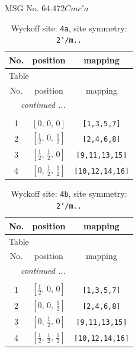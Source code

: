 \documentclass[fleqn,8pt]{jsarticle}
\begin{document}
\setcounter{MaxMatrixCols}{32}

\renewcommand{\tablename}{Table~}
\renewcommand{\figurename}{Figure~}
\begin{center}
\LARGE
MSG No. 64.472\quad$Cmc'a$
\end{center}
\renewcommand{\arraystretch}{1.2}
\begin{longtable}{ccc}
\caption{Wyckoff site: {\tt 4a}, site symmetry: {\tt 2'/m..}}
 \\
 \hline \hline
No. & position & mapping \\ \hline \endfirsthead

\multicolumn{2}{l}{\tablename\ \thetable{}} \\
 \hline \hline
No. & position & mapping \\ \hline \endhead

 \hline \hline
\multicolumn{2}{r}{\footnotesize\it continued ...} \\ \endfoot

 \hline \hline
\multicolumn{2}{r}{} \\ \endlastfoot

1 & $\left[ 0,\, 0,\, 0 \right]$ & {\tt [1,3,5,7]} \\ \hline
2 & $\left[ \frac{1}{2},\, 0,\, \frac{1}{2} \right]$ & {\tt [2,4,6,8]} \\ \hline
3 & $\left[ \frac{1}{2},\, \frac{1}{2},\, 0 \right]$ & {\tt [9,11,13,15]} \\ \hline
4 & $\left[ 0,\, \frac{1}{2},\, \frac{1}{2} \right]$ & {\tt [10,12,14,16]} \\
\end{longtable}
\renewcommand{\arraystretch}{1.2}
\begin{longtable}{ccc}
\caption{Wyckoff site: {\tt 4b}, site symmetry: {\tt 2'/m..}}
 \\
 \hline \hline
No. & position & mapping \\ \hline \endfirsthead

\multicolumn{2}{l}{\tablename\ \thetable{}} \\
 \hline \hline
No. & position & mapping \\ \hline \endhead

 \hline \hline
\multicolumn{2}{r}{\footnotesize\it continued ...} \\ \endfoot

 \hline \hline
\multicolumn{2}{r}{} \\ \endlastfoot

1 & $\left[ \frac{1}{2},\, 0,\, 0 \right]$ & {\tt [1,3,5,7]} \\ \hline
2 & $\left[ 0,\, 0,\, \frac{1}{2} \right]$ & {\tt [2,4,6,8]} \\ \hline
3 & $\left[ 0,\, \frac{1}{2},\, 0 \right]$ & {\tt [9,11,13,15]} \\ \hline
4 & $\left[ \frac{1}{2},\, \frac{1}{2},\, \frac{1}{2} \right]$ & {\tt [10,12,14,16]} \\
\end{longtable}
\end{document}
